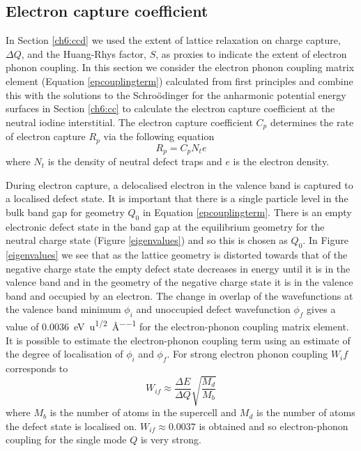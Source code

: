 \subsection{Electron capture coefficient} \label{finalsection}

In Section \ref{ch6:ccd} we used the extent of lattice relaxation on charge capture, $\Delta Q$, and the Huang-Rhys factor, $S$, as proxies to indicate the extent of electron phonon coupling. In this section we consider the electron phonon coupling matrix element (Equation \ref{epcouplingterm}) calculated from first principles and combine this with the solutions to the Schro\"{o}dinger for the anharmonic potential energy surfaces in Section \ref{ch6:cc} to calculate the electron capture coefficient at the neutral iodine interstitial. The electron capture coefficient $C_p$ determines the rate of electron capture $R_p$ via the following equation
\begin{equation}
R_p=C_pN_te
\end{equation}
where $N_t$ is the density of neutral defect traps and $e$ is the electron density.

During electron capture, a delocalised electron in the valence band is captured to a localised defect state. It is important that there is a single particle level in the bulk band gap for geometry $Q_0$ in Equation \ref{epcouplingterm}. There is an empty electronic defect state in the band gap at the equilibrium geometry for the neutral charge state (Figure \ref{eigenvalues}) and so this is chosen as $Q_0$.
\autocite{Alkauskas 2014}
In Figure \ref{eigenvalues} we see that as the lattice geometry is distorted towards that of the negative charge state the empty defect state decreases in energy until it is in the valence band and in the geometry of the negative charge state it is in the valence band and occupied by an electron. 
The change in overlap of the wavefunctions at the valence band minimum $\phi_i$ and unoccupied defect wavefunction $\phi_f$ gives a value of \SI{0.0036}{\electronvolt\per\amu\tothe{1/2}\per\angstrom} for the electron-phonon coupling matrix element.
It is possible to estimate the electron-phonon coupling term using an estimate of the degree of localisation of $\phi_i$ and $\phi_f$. For strong electron phonon coupling $W_if$ corresponds to 
\begin{equation}
W_{if} \approx \frac{\Delta E}{\Delta Q}\sqrt{\frac{M_d}{M_b}}
\end{equation}
where $M_b$ is the number of atoms in the supercell and $M_d$ is the number of atoms the defect state is localised on. $W_{if}\approx0.0037$ is obtained and so electron-phonon coupling for the single mode $Q$ is very strong.

